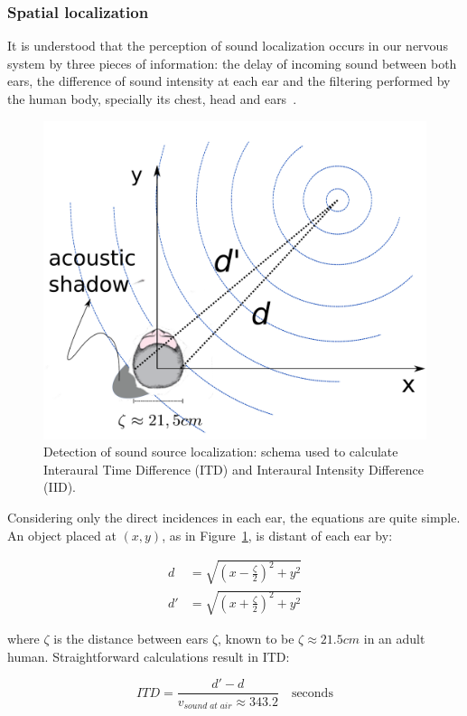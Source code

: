 \subsubsection{Spatial localization}
It is understood that the perception of sound localization occurs in our nervous system by three pieces of information: the delay of incoming sound between both ears, the difference of sound intensity at each ear and the filtering performed by the human body, specially its chest, head and ears~\cite{Roederer, hrtf, Heeger}. 

\begin{figure}[h!]
    \centering
        \includegraphics[width=.5\textwidth]{figures/espacializacao___}
    \caption{Detection of sound source localization: schema used to calculate Interaural Time Difference (ITD) and Interaural Intensity Difference (IID).}
    \label{fig:spac}
\end{figure}

Considering only the direct incidences in each ear, the equations are quite simple. An object placed at $(x,y)$, as in Figure~\ref{fig:spac}, is distant of each ear by:

\begin{equation}\label{eq:distOuvidos}
\begin{split}
d & =\sqrt{\left (x-\frac{\zeta}{2} \right )^2+y^2} \\
d' & =\sqrt{\left (x+\frac{\zeta}{2} \right )^2 + y^2}
\end{split}
\end{equation}

\noindent where $\zeta$ is the distance between ears $\zeta$, known to be $\zeta \approx 21.5cm$ in an adult human. Straightforward calculations result in ITD:

\begin{equation}\label{eq:dti}
ITD=\frac{d'-d}{v_{sound\;at\;air}\approx 343.2 }\quad \text{seconds}
\end{equation}

